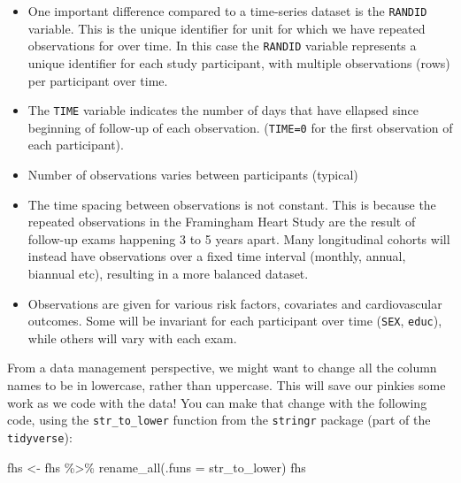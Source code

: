 \documentclass[
]{book}
\newenvironment{Shaded}{\begin{snugshade}}{\end{snugshade}}
\newcommand{\AttributeTok}[1]{\textcolor[rgb]{0.77,0.63,0.00}{#1}}
\newcommand{\FunctionTok}[1]{\textcolor[rgb]{0.00,0.00,0.00}{#1}}
\newcommand{\NormalTok}[1]{#1}
\newcommand{\OtherTok}[1]{\textcolor[rgb]{0.56,0.35,0.01}{#1}}
\newcommand{\SpecialCharTok}[1]{\textcolor[rgb]{0.00,0.00,0.00}{#1}}
\providecommand{\tightlist}{%
  \setlength{\itemsep}{0pt}\setlength{\parskip}{0pt}}
\begin{document}
\begin{itemize}
\tightlist
\item
  One important difference compared to a time-series dataset is the \texttt{RANDID} variable. This is the unique identifier for unit for which we have repeated observations for over time.
  In this case the \texttt{RANDID} variable represents a unique identifier for each study participant, with multiple observations (rows) per participant over time.
\item
  The \texttt{TIME} variable indicates the number of days that have ellapsed since beginning of follow-up of each observation. (\texttt{TIME=0} for the first observation of each participant).
\item
  Number of observations varies between participants (typical)
\item
  The time spacing between observations is not constant. This is because the repeated observations in the Framingham Heart Study are the result of follow-up exams happening 3 to 5 years apart. Many longitudinal cohorts will instead have observations over a fixed time interval (monthly, annual, biannual etc), resulting in a more balanced dataset.
\item
  Observations are given for various risk factors, covariates and cardiovascular outcomes. Some will be invariant for each participant over time (\texttt{SEX}, \texttt{educ}), while others will vary with each exam.
\end{itemize}

From a data management perspective, we might want to change all the column names
to be in lowercase, rather than uppercase. This will save our pinkies some
work as we code with the data! You can make that change with the following
code, using the \texttt{str\_to\_lower} function from the \texttt{stringr} package (part of
the \texttt{tidyverse}):

\begin{Shaded}
\begin{Highlighting}[]
\NormalTok{fhs }\OtherTok{\textless{}{-}}\NormalTok{ fhs }\SpecialCharTok{\%\textgreater{}\%} 
  \FunctionTok{rename\_all}\NormalTok{(}\AttributeTok{.funs =}\NormalTok{ str\_to\_lower)}
\NormalTok{fhs}
\end{Highlighting}
\end{Shaded}
\end{document}
